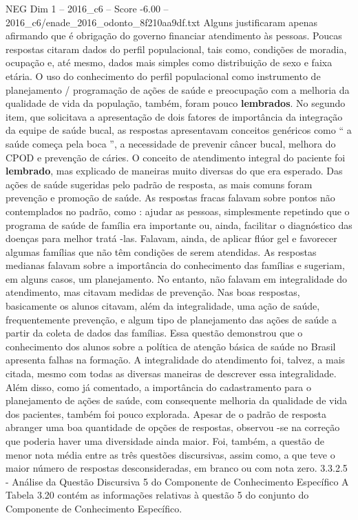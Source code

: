 \begin{textsample}{NEG Dim 1 – 2016\_c6 – Score -6.00 – 2016\_c6/enade\_2016\_odonto\_8f210aa9df.txt}
Alguns justificaram apenas afirmando que é obrigação do governo financiar atendimento às pessoas.
Poucas respostas citaram dados do perfil populacional, tais como, condições de moradia, ocupação e, até mesmo, dados mais simples como distribuição de sexo e faixa etária.
O uso do conhecimento do perfil populacional como instrumento de planejamento / programação de ações de saúde e preocupação com a melhoria da qualidade de vida da população, também, foram pouco \textbf{lembrados}.
No segundo item, que solicitava a apresentação de dois fatores de importância da integração da equipe de saúde bucal, as respostas apresentavam conceitos genéricos como “ a saúde começa pela boca ”, a necessidade de prevenir câncer bucal, melhora do CPOD e prevenção de cáries.
O conceito de atendimento integral do paciente foi \textbf{lembrado}, mas explicado de maneiras muito diversas do que era esperado.
Das ações de saúde sugeridas pelo padrão de resposta, as mais comuns foram prevenção e promoção de saúde.
As respostas fracas falavam sobre pontos não contemplados no padrão, como : ajudar as pessoas, simplesmente repetindo que o programa de saúde de família era importante ou, ainda, facilitar o diagnóstico das doenças para melhor tratá -las.
Falavam, ainda, de aplicar flúor gel e favorecer algumas famílias que não têm condições de serem atendidas.
As respostas medianas falavam sobre a importância do conhecimento das famílias e sugeriam, em alguns casos, um planejamento.
No entanto, não falavam em integralidade do atendimento, mas citavam medidas de prevenção.
Nas boas respostas, basicamente os alunos citavam, além da integralidade, uma ação de saúde, frequentemente prevenção, e algum tipo de planejamento das ações de saúde a partir da coleta de dados das famílias.
Essa questão demonstrou que o conhecimento dos alunos sobre a política de atenção básica de saúde no Brasil apresenta falhas na formação.
A integralidade do atendimento foi, talvez, a mais citada, mesmo com todas as diversas maneiras de descrever essa integralidade.
Além disso, como já comentado, a importância do cadastramento para o planejamento de ações de saúde, com consequente melhoria da qualidade de vida dos pacientes, também foi pouco explorada.
Apesar de o padrão de resposta abranger uma boa quantidade de opções de respostas, observou -se na correção que poderia haver uma diversidade ainda maior.
Foi, também, a questão de menor nota média entre as três questões discursivas, assim como, a que teve o maior número de respostas desconsideradas, em branco ou com nota zero. 3.3.2.5 - Análise da Questão Discursiva 5 do Componente de Conhecimento Específico A Tabela 3.20 contém as informações relativas à questão 5 do conjunto do Componente de Conhecimento Específico.

\end{textsample}
